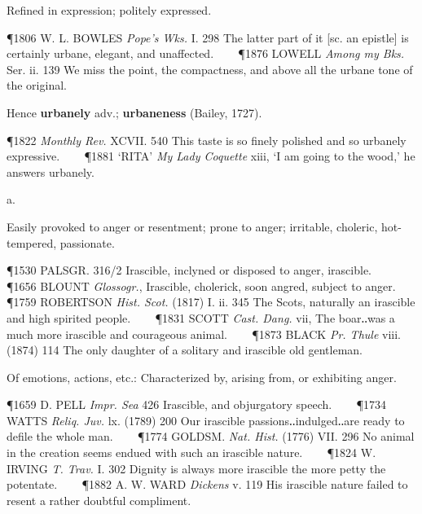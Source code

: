 \begin{description}[wide, labelwidth=!, labelindent=0pt]
\begin{myenumerate}
 Refined in expression; politely expressed.

\P 1806 W. L. BOWLES  \textit{Pope's Wks.} I. 298 The latter part of it [sc. an epistle] is certainly urbane, elegant, and unaffected.    
\P 1876 LOWELL  \textit{Among my Bks.} Ser. ii. 139 We miss the point, the compactness, and above all the urbane tone of the original.

\noindent Hence \textbf{urbanely} adv.; \textbf{urbaneness} (Bailey, 1727).

\P 1822  \textit{Monthly Rev.} XCVII. 540 This taste is so finely polished and so urbanely expressive.    
\P 1881 ‘RITA’  \textit{My Lady Coquette} xiii, ‘I am going to the wood,’ he answers urbanely.
\end{myenumerate}


 a.

\noindent {}

\vspace{-0.3cm}

\begin{myenumerate}

 Easily provoked to anger or resentment; prone to anger; irritable, choleric, hot-tempered, passionate.

\P 1530 PALSGR. 316/2 Irascible, inclyned or disposed to anger, irascible.    
\P 1656 BLOUNT  \textit{Glossogr.}, Irascible, cholerick, soon angred, subject to anger.    
\P 1759 ROBERTSON  \textit{Hist. Scot.} (1817) I. ii. 345 The Scots, naturally an irascible and high spirited people.    
\P 1831 SCOTT  \textit{Cast. Dang.} vii, The boar‥was a much more irascible and courageous animal.    
\P 1873 BLACK  \textit{Pr. Thule} viii. (1874) 114 The only daughter of a solitary and irascible old gentleman.

 Of emotions, actions, etc.: Characterized by, arising from, or exhibiting anger.

\P 1659 D. PELL  \textit{Impr. Sea} 426 Irascible, and objurgatory speech.    
\P 1734 WATTS  \textit{Reliq. Juv.} lx. (1789) 200 Our irascible passions‥indulged‥are ready to defile the whole man.    
\P 1774 GOLDSM.  \textit{Nat. Hist.} (1776) VII. 296 No animal in the creation seems endued with such an irascible nature.    
\P 1824 W. IRVING  \textit{T. Trav.} I. 302 Dignity is always more irascible the more petty the potentate.    
\P 1882 A. W. WARD  \textit{Dickens} v. 119 His irascible nature failed to resent a rather doubtful compliment.


\end{myenumerate}
\end{description}
